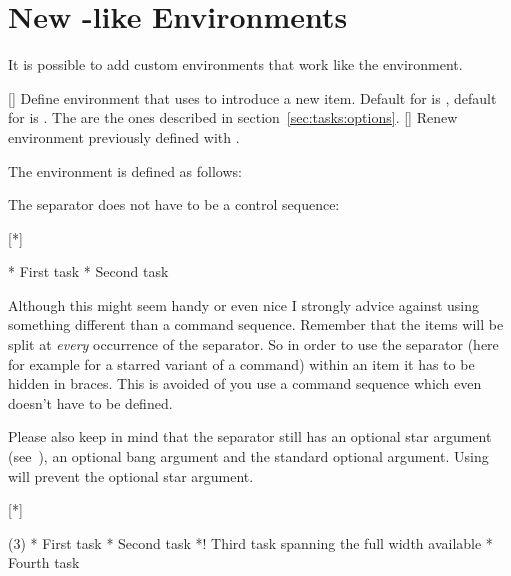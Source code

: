 \documentclass{tasks-manual}
\begin{document}
\section{New -like Environments}
It is possible to add custom environments that work like the 
environment.
\begin{commands}
  []
    Define environment  that uses  to introduce a
    new item.  Default for  is , default for
     is .  The  are the ones described in
    section~\ref{sec:tasks:options}.
  []
    Renew environment previously defined with .
\end{commands}
The  environment is defined as follows:
\begin{sourcecode}
\end{sourcecode}

The separator does not have to be a control sequence:
\begin{example}
  [*]
  \begin{done}
    * First task
    * Second task
  \end{done}
\end{example}
Although this might seem handy or even nice I strongly advice against using
something different than a command sequence. Remember that the items will be
split at \emph{every} occurrence of the separator.  So in order to use the
separator (here for example for a starred variant of a command) within an item
it has to be hidden in braces.  This is avoided of you use a command sequence
which even doesn't have to be defined.

Please also keep in mind that the separator still has an optional star
argument (see~\pageref{optional-star}), an optional bang argument and the
standard optional argument.  Using \code{*} will prevent the optional star
argument.

\begin{example}
  [*]
  \begin{done}(3)
    * First task
    * Second task
    *! Third task spanning the full width available
    * Fourth task
  \end{done}
\end{example}
\end{document}
